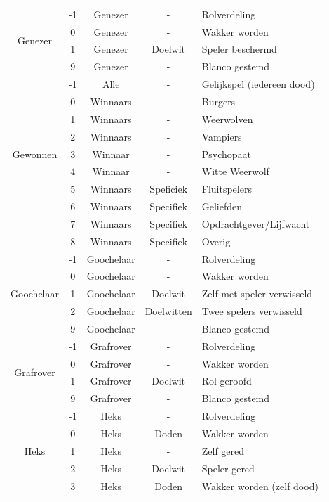 \documentclass[12pt]{article}
\begin{document}
\begin{center}
\begin{longtable}{c|c|c|c|l}
      \hline
      \multirow{4}{*}{Genezer} & -1 & Genezer & - & Rolverdeling \\
       & 0 & Genezer & - & Wakker worden \\
       & 1 & Genezer & Doelwit & Speler beschermd \\
       & 9 & Genezer & - & Blanco gestemd \\
      \hline
      \multirow{9}{*}{Gewonnen} & -1 & Alle & - & Gelijkspel (iedereen dood) \\
       & 0 & Winnaars & - & Burgers \\
       & 1 & Winnaars & - & Weerwolven \\
       & 2 & Winnaars & - & Vampiers \\
       & 3 & Winnaar & - & Psychopaat \\
       & 4 & Winnaar & - & Witte Weerwolf \\
       & 5 & Winnaars & Speficiek & Fluitspelers \\
       & 6 & Winnaars & Specifiek & Geliefden \\
       & 7 & Winnaars & Specifiek & Opdrachtgever/Lijfwacht \\
       & 8 & Winnaars & Specifiek & Overig \\
      \hline
      \multirow{5}{*}{Goochelaar} & -1 & Goochelaar & - & Rolverdeling \\
       & 0 & Goochelaar & - & Wakker worden \\
       & 1 & Goochelaar & Doelwit & Zelf met speler verwisseld \\
       & 2 & Goochelaar & Doelwitten & Twee spelers verwisseld \\
       & 9 & Goochelaar & - & Blanco gestemd \\
      \hline
      \multirow{4}{*}{Grafrover} & -1 & Grafrover & - & Rolverdeling \\
       & 0 & Grafrover & - & Wakker worden \\
       & 1 & Grafrover & Doelwit & Rol geroofd \\
       & 9 & Grafrover & - & Blanco gestemd \\
      \hline
      \multirow{8}{*}{Heks} & -1 & Heks & - & Rolverdeling \\
       & 0 & Heks & Doden & Wakker worden \\
       & 1 & Heks & - & Zelf gered \\
       & 2 & Heks & Doelwit & Speler gered \\
       & 3 & Heks & Doden & Wakker worden (zelf dood) \\

\end{longtable}
\end{center}
\end{document}
